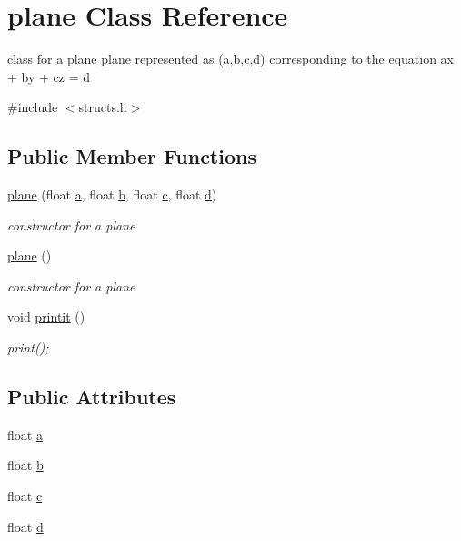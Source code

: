 \hypertarget{classplane}{}\section{plane Class Reference}
\label{classplane}


class for a plane plane represented as (a,b,c,d) corresponding to the equation ax + by + cz = d  




{\ttfamily \#include $<$structs.\+h$>$}

\subsection*{Public Member Functions}
\begin{DoxyCompactItemize}
\item 
\hyperlink{classplane_adbf234bb1d3aca2d226e32cb6dea9199}{plane} (float \hyperlink{classplane_a93c319b577955eca012b2866db926c1f}{a}, float \hyperlink{classplane_af4a97d4328067448317dd787e048bc70}{b}, float \hyperlink{classplane_a3024e149a5b2cb4697fa71ae7d539bd1}{c}, float \hyperlink{classplane_a9a3cb65698785bad8199e7afbd083e27}{d})
\begin{DoxyCompactList}\small\item\em constructor for a plane \end{DoxyCompactList}\item 
\hyperlink{classplane_ab36174f444a88d3a53d9892828308b48}{plane} ()
\begin{DoxyCompactList}\small\item\em constructor for a plane \end{DoxyCompactList}\item 
void \hyperlink{classplane_ab58a90304cbd0db72264be65b3207677}{printit} ()
\begin{DoxyCompactList}\small\item\em print(); \end{DoxyCompactList}\end{DoxyCompactItemize}
\subsection*{Public Attributes}
\begin{DoxyCompactItemize}
\item 
float \hyperlink{classplane_a93c319b577955eca012b2866db926c1f}{a}
\item 
float \hyperlink{classplane_af4a97d4328067448317dd787e048bc70}{b}
\item 
float \hyperlink{classplane_a3024e149a5b2cb4697fa71ae7d539bd1}{c}
\item 
float \hyperlink{classplane_a9a3cb65698785bad8199e7afbd083e27}{d}
\end{DoxyCompactItemize}



